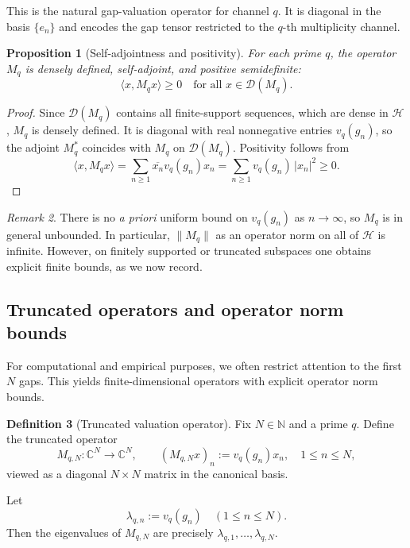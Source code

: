 \documentclass[11pt]{article}
\theoremstyle{definition}
\newtheorem{definition}{Definition}[section]
\theoremstyle{plain}
\newtheorem{proposition}[definition]{Proposition}
\theoremstyle{remark}
\newtheorem{remark}[definition]{Remark}
\newcommand{\1}{\mathbb{1}}
\begin{document}
This is the natural gap-valuation operator for channel \(q\). It is diagonal in the basis \(\{e_n\}\) and encodes the gap tensor restricted to the \(q\)-th multiplicity channel.

\begin{proposition}[Self-adjointness and positivity]
For each prime \(q\), the operator \(M_q\) is densely defined, self-adjoint, and positive semidefinite:
\[
  \langle x, M_q x \rangle \ge 0\quad\text{for all } x\in \mathcal{D}(M_q).
\]
\end{proposition}

\begin{proof}
Since \(\mathcal{D}(M_q)\) contains all finite-support sequences, which are dense in \(\mathcal{H}\), \(M_q\) is densely defined. It is diagonal with real nonnegative entries \(v_q(g_n)\), so the adjoint \(M_q^\ast\) coincides with \(M_q\) on \(\mathcal{D}(M_q)\). Positivity follows from
\[
  \langle x, M_q x \rangle 
  = \sum_{n\ge 1} \overline{x_n} v_q(g_n) x_n
  = \sum_{n\ge 1} v_q(g_n)\,|x_n|^2 \ge 0.
\]
\end{proof}

\begin{remark}
There is no \emph{a priori} uniform bound on \(v_q(g_n)\) as \(n\to\infty\), so \(M_q\) is in general unbounded. In particular, \(\|M_q\|\) as an operator norm on all of \(\mathcal{H}\) is infinite. However, on finitely supported or truncated subspaces one obtains explicit finite bounds, as we now record.
\end{remark}

\subsection{Truncated operators and operator norm bounds}

For computational and empirical purposes, we often restrict attention to the first \(N\) gaps. This yields finite-dimensional operators with explicit operator norm bounds.

\begin{definition}[Truncated valuation operator]
Fix \(N \in \mathbb{N}\) and a prime \(q\). Define the truncated operator
\[
  M_{q,N} : \mathbb{C}^N \to \mathbb{C}^N,\qquad (M_{q,N} x)_n := v_q(g_n) x_n,\quad 1\le n\le N,
\]
viewed as a diagonal \(N\times N\) matrix in the canonical basis.
\end{definition}

Let
\[
  \lambda_{q,n} := v_q(g_n)\quad (1\le n\le N).
\]
Then the eigenvalues of \(M_{q,N}\) are precisely \(\lambda_{q,1},\dots,\lambda_{q,N}\).
\end{document}
